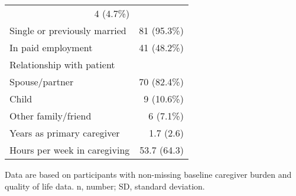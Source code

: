 \documentclass{article}
\begin{document}
\begin{table}[!h]
\begin{tabular}{ll}
  \multicolumn{1}{r}{4 (4.7\%)} \\
\multicolumn{1}{l}{\hspace{2em}Single or previously married} &
  \multicolumn{1}{r}{81 (95.3\%)} \\
\multicolumn{1}{l}{\hspace{1em}In paid employment} &
  \multicolumn{1}{r}{41 (48.2\%)} \\
\multicolumn{1}{l}{\hspace{1em}Relationship with patient} &
  \multicolumn{1}{r}{} \\
\multicolumn{1}{l}{\hspace{2em}Spouse/partner} &
  \multicolumn{1}{r}{70 (82.4\%)} \\
\multicolumn{1}{l}{\hspace{2em}Child} &
  \multicolumn{1}{r}{9 (10.6\%)} \\
\multicolumn{1}{l}{\hspace{2em}Other family/friend} &
  \multicolumn{1}{r}{6 (7.1\%)} \\
\multicolumn{1}{l}{\hspace{1em}Years as primary caregiver} &
  \multicolumn{1}{r}{1.7 (2.6)} \\
\multicolumn{1}{l}{\hspace{1em}Hours per week in caregiving} &
  \multicolumn{1}{r}{53.7 (64.3)} \\
\cline{1-2}
\end{tabular}

\footnotesize{
Data are based on participants with non-missing baseline caregiver burden and quality of life data. n, number; SD, standard deviation.
}
\end{table}
\end{document}
